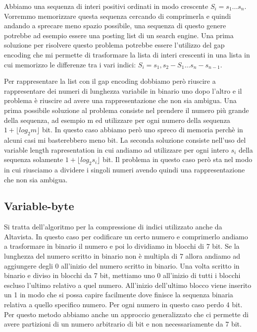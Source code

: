 \documentclass[14pt]{extreport}
\begin{document}
Abbiamo una sequenza di interi positivi ordinati in modo crescente $S_i = s_1 ... s_n$.
Vorremmo memorizzare questa sequenza cercando di comprimerla e quindi andando a sprecare meno spazio possibile, una sequenza di questo genere potrebbe ad esempio essere una posting list di un search engine.
Una prima soluzione per risolvere questo problema potrebbe essere l'utilizzo del gap encoding che mi permette di trasformare la lista di interi crescenti in una lista in cui memorizzo le differenze tra i vari indici: $S_i = s_1, s_{2} - S_1 ... s_n - s_{n-1}$.

Per rappresentare la list con il gap encoding dobbiamo però riuscire a rappresentare dei numeri di lunghezza variabile in binario uno dopo l'altro e il problema è riuscire ad avere una rappresentazione che non sia ambigua.
Una prima possibile soluzione al problema consiste nel prendere il numero più grande della sequenza, ad esempio m ed utilizzare per ogni numero della sequenza $1 + \lfloor{log_2 m}\rfloor$ bit.
In questo caso abbiamo però uno spreco di memoria perchè in alcuni casi mi basterebbero meno bit.
La seconda soluzione consiste nell'uso del variable length rapresentation in cui andiamo ad utilizzare per ogni intero $s_i$ della sequenza solamente $1 + \lfloor{log_2 s_i}\rfloor$ bit. Il problema in questo caso però sta nel modo in cui riusciamo a dividere i singoli numeri avendo quindi una rappresentazione che non sia ambigua.

\subsection{Variable-byte}

Si tratta dell'algoritmo per la compressione di indici utilizzato anche da Altavista. In questo caso per codificare un certo numero e comprimerlo andiamo a trasformare in binario il numero e poi lo dividiamo in blocchi di 7 bit.
Se la lunghezza del numero scritto in binario non è multipla di 7 allora andiamo ad aggiungere degli 0 all'inizio del numero scritto in binario.
Una volta scritto in binario e diviso in blocchi da 7 bit, mettiamo uno 0 all'inizio di tutti i blocchi escluso l'ultimo relativo a quel numero. All'inizio dell'ultimo blocco viene inserito un 1 in modo che si possa capire facilmente dove finisce la sequenza binaria relativa a quello specifico numero.
Per ogni numero in questo caso perdo 4 bit.
Per questo metodo abbiamo anche un approccio generalizzato che ci permette di avere partizioni di un numero arbitrario di bit e non necessariamente da 7 bit.
\end{document}
